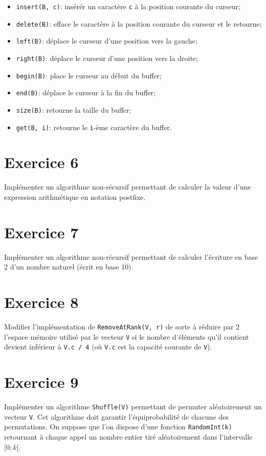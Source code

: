 \documentclass[a4paper,10pt]{article}
\begin{document}
\begin{itemize}
\item \texttt{insert(B, c)}: insérér un caractère \texttt{c} à la position courante du curseur;
\item \texttt{delete(B)}: efface le caractère à la position courante du curseur et le retourne;
\item \texttt{left(B)}: déplace le curseur d'une position vers la gauche;
\item \texttt{right(B)}: déplace le curseur d'une position vers la droite;
\item \texttt{begin(B)}: place le curseur au début du buffer;
\item \texttt{end(B)}: déplace le curseur à la fin du buffer;
\item \texttt{size(B)}: retourne la taille du buffer;
\item \texttt{get(B, i)}: retourne le \texttt{i}-ème caractère du buffer.
\end{itemize}

\section*{Exercice 6}

Implémenter un algorithme non-récursif permettant de calculer la valeur d'une
expression arithmétique en notation postfixe.

\section*{Exercice 7}

Implémenter un algorithme non-récursif permettant de calculer l'écriture en base 2 d'un nombre naturel (écrit en base 10).


\section*{Exercice 8}

Modifier l'implémentation de \texttt{RemoveAtRank(V, r)} de sorte à réduire par
2 l'espace mémoire utilisé par le vecteur \texttt{V} si le nombre d'éléments
qu'il contient devient inférieur à \texttt{V.c / 4} (où \texttt{V.c} est la capacité
courante de \texttt{V}).

\section*{Exercice 9}

Implémenter un algorithme \texttt{Shuffle(V)} permettant de permuter
aléatoirement un vecteur \texttt{V}. Cet algorithme doit garantir
l'équiprobabilité de chacune des permutations. On suppose que l'on dispose d'une
fonction \texttt{RandomInt(k)} retournant à chaque appel un nombre entier tiré
aléatoirement dans l'intervalle $[0; k[$.
\end{document}
